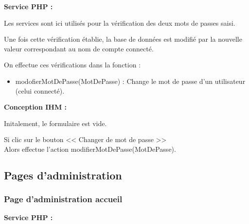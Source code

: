 			\begin{paragraphe}
				\textbf{Service PHP :}
			\end{paragraphe}

			\begin{paragraphe}
				Les services sont ici utilisés pour la vérification des deux mots de passes saisi.\par
				Une fois cette vérification établie, la base de données est modifié par la nouvelle valeur correspondant au nom de compte connecté.
			\end{paragraphe}

			\begin{paragraphe}
				On effectue ces vérifications dans la fonction :
				\begin{itemize}
					\item modofierMotDePasse(MotDePasse) : Change le mot de passe d'un utilisateur (celui connecté).
				\end{itemize}
			\end{paragraphe}

			\begin{paragraphe}
				\textbf{Conception IHM :}
			\end{paragraphe}

			\begin{paragraphe}
				Initalement, le formulaire est vide.
			\end{paragraphe}


			\begin{paragraphe}
				Si clic sur le bouton << Changer de mot de passe >> \\
				Alors effectue l'action modifierMotDePasse(MotDePasse).
			\end{paragraphe}

	\clearpage

	\subsection{Pages d'administration}
		\subsubsection{Page d'administration accueil}

			\begin{paragraphe}
				\textbf{Service PHP :}
			\end{paragraphe}


